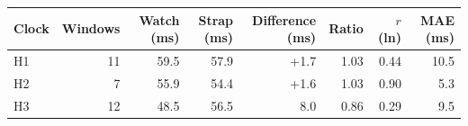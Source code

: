 \begin{tabular}{lrrrrrrr}
\toprule
Clock & Windows & Watch (ms) & Strap (ms) & Difference (ms) & Ratio & $r$ (ln) & MAE (ms) \\
\midrule
H1 & 11 & 59.5 & 57.9 & +1.7 & 1.03 & 0.44 & 10.5 \\
H2 & 7 & 55.9 & 54.4 & +1.6 & 1.03 & 0.90 & 5.3 \\
H3 & 12 & 48.5 & 56.5 & \textminus{}8.0 & 0.86 & 0.29 & 9.5 \\
\bottomrule
\end{tabular}
